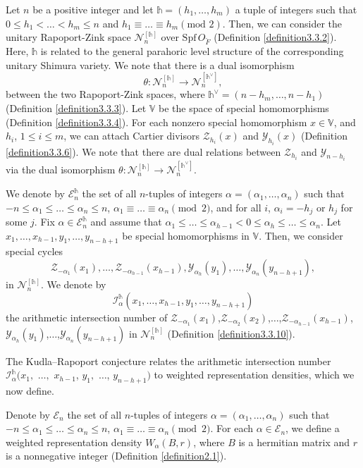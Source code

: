 \documentclass[11pt,oneside]{amsart}
\theoremstyle{plain}
\theoremstyle{definition}
\theoremstyle{remark}
\newcommand{\tx}[1]{\text{#1}}
\newcommand{\BV}{{\mathbb V}}
\newcommand{\CE}{{\mathcal E}}
\newcommand{\CI}{{\mathcal I}}
\newcommand{\CN}{{\mathcal N}}
\newcommand{\CY}{{\mathcal Y}}
\newcommand{\CZ}{{\mathcal Z}}
\newcommand{\Spf}{\mathrm{Spf}\, }
\numberwithin{equation}{section}
\begin{document}
	 Let $n$ be a positive integer and let $\mathds{h}=(h_1,\dots,h_m)$ a tuple of integers such that $0\leq h_1<\dots<h_m \leq n$ and $h_1 \equiv \dots \equiv h_m (\tx{mod } 2)$. Then, we can consider the unitary Rapoport-Zink space $\CN^{[\mathds{h}]}_n$ over $\Spf O_{\breve{F}}$ (Definition \ref{definition3.3.2}). Here, $\mathds{h}$ is related to the general parahoric level structure of the corresponding unitary Shimura variety.  We note that there is a dual isomorphism $$\theta:\CN_n^{[\mathds{h}]} \rightarrow \CN_{n}^{[\mathds{h}^{\vee}]},$$ between the two Rapoport-Zink spaces, where $\mathds{h}^{\vee}=(n-h_m,\dots,n-h_1)$ (Definition \ref{definition3.3.3}). Let $\BV$ be the space of special homomorphisms (Definition \ref{definition3.3.4}). For each nonzero special homomorphism $x \in \BV$, and $h_i$, $1 \leq i \leq m$, we can attach Cartier divisors $\CZ_{h_i}(x)$ and $\CY_{h_i}(x)$ (Definition \ref{definition3.3.6}). We note that there are dual relations between $\CZ_{h_i}$ and $\CY_{n-h_i}$ via the dual isomorphism $\theta:\CN_n^{[\mathds{h}]} \rightarrow \CN_{n}^{[\mathds{h}^{\vee}]}$.
	 
	  We denote by $\CE_{n}^{\mathds{h}}$ the set of all $n$-tuples of integers $\alpha=(\alpha_1,\dots,\alpha_n)$ such that $-n \leq \alpha_1 \leq  \dots \leq \alpha_n \leq n$, $\alpha_1 \equiv \dots \equiv \alpha_n \pmod{2}$, and for all $i$, $\alpha_i =-h_j \tx{ or } h_j$ for some $j$. Fix $\alpha \in \CE_n^{\mathds{h}}$ and assume that $\alpha_1 \leq \dots \leq \alpha_{h-1} < 0 \leq \alpha_h \leq \dots \leq \alpha_n$. Let $x_1,\dots,x_{h-1}, y_1,\dots,y_{n-h+1}$ be special homomorphisms in $\BV$. Then, we consider special cycles
	  \begin{equation*}
	  	\CZ_{-\alpha_1}(x_1),\dots,\CZ_{-\alpha_{h-1}}(x_{h-1}),\CY_{\alpha_h}(y_1),\dots,\CY_{\alpha_n}(y_{n-h+1}),
	  \end{equation*}
	  in $\CN^{[\mathds{h}]}_n$. We denote by $$\CI_{\alpha}^{\mathds{h}}(x_1,\dots,x_{h-1},y_1,\dots,y_{n-h+1})$$ the arithmetic intersection number of $\CZ_{-\alpha_1}(x_1)$,$\CZ_{-\alpha_2}(x_2)$,$\dots$,$\CZ_{-\alpha_{h-1}}(x_{h-1})$,$\CY_{\alpha_h}(y_1)$,$\dots$,$\CY_{\alpha_n}(y_{n-h+1})$ in $\CN^{[\mathds{h}]}_n$ (Definition \ref{definition3.3.10}).
	  
	  The Kudla--Rapoport conjecture relates the arithmetic intersection number $\CI_{\alpha}^{\mathds{h}}(x_1,$ $\dots,$ $x_{h-1}$, $y_1,$ $\dots$, $y_{n-h+1})$ to weighted representation densities, which we now define.
	  
	 Denote by $\CE_{n}$ the set of all $n$-tuples of integers $\alpha=(\alpha_1,\dots,\alpha_n)$ such that $-n \leq \alpha_1 \leq  \dots \leq \alpha_n \leq n$, $\alpha_1 \equiv \dots \equiv \alpha_n \pmod{2}$. For each $\alpha \in \CE_{n}$, we define a weighted representation density $W_{\alpha}(B,r)$, where $B$ is a hermitian matrix and $r$ is a nonnegative integer (Definition \ref{definition2.1}).
	 
\end{document}
